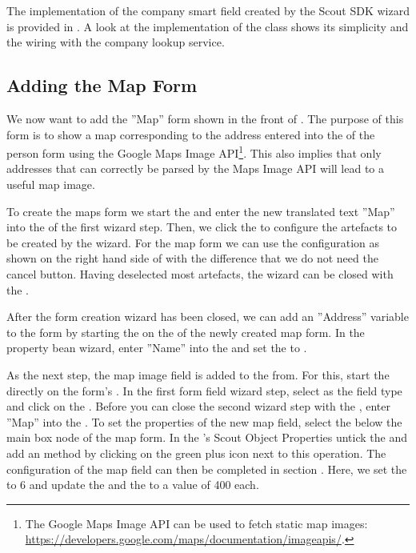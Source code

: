 \documentclass[a4paper,10pt,twoside]{book}
\begin{document}
The implementation of the company smart field created by the Scout SDK wizard is provided in . 
A look at the implementation of the  class shows its simplicity and the wiring with the company lookup service.

\subsection{Adding the Map Form}

We now want to add the ''Map'' form shown in the front of .
The purpose of this form is to show a map corresponding to the address entered into the  of the person form using the Google Maps Image API\footnote{
The Google Maps Image API can be used to fetch static map images: \url{https://developers.google.com/maps/documentation/imageapis/}.
}.
This also implies that only addresses that can correctly be parsed by the Maps Image API will lead to a useful map image.

To create the maps form we start the  and enter the new translated text ''Map'' into the  of the first wizard step. 
Then, we click the  to configure the artefacts to be created by the wizard. 
For the map form we can use the configuration as shown on the right hand side of  with the difference that we do not need the cancel button.
Having deselected most artefacts, the wizard can be closed with the .

After the form creation wizard has been closed, we can add an ''Address'' variable to the form by starting the  on the  of the newly created map form.
In the property bean wizard, enter ''Name'' into the  and set the  to . 

As the next step, the map image field is added to the from. 
For this, start the  directly on the form's . 
In the first form field wizard step, select  as the field type and click on the . 
Before you can close the second wizard step with the , enter ''Map'' into the . 
To set the properties of the new map field, select the  below the main box node of the map form. 
In the 's Scout Object Properties untick the  and add an  method by clicking on the green plus icon next to this operation. 
The configuration of the map field can then be completed in section . 
Here, we set the  to 6 and update the  and the  to a value of 400 each.
\end{document}
